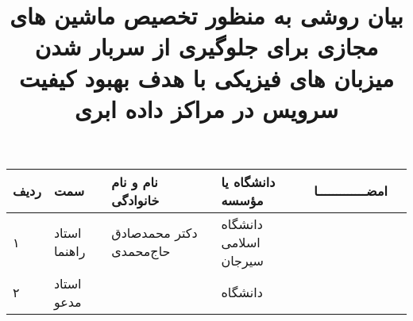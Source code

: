 \subject{مهندسی کامپیوتر}
\title{بیان روشی به منظور تخصیص ماشین های مجازی برای
	جلوگیری از سربار شدن میزبان های فیزیکی با هدف بهبود
	کیفیت سرویس در مراکز داده ابری}


\firstPage
{}
\besmPage
\davaranPage

\begin{center}
		\centering
\begin{tabular}{| p{8mm} | p{18mm} | p{36mm} |p{35mm}|p{}|c|}

\hline
ردیف	& سمت & نام و نام خانوادگی &	دانشگاه یا مؤسسه &	امضـــــــــــــا\\
\hline
۱  &	استاد راهنما				 & دکتر \newline محمدصادق حاج‌محمدی&  دانشگاه  اسلامی سیرجان &  \\
\hline
۲ &     استاد مدعو				 &  & دانشگاه \newline  & \\
\hline
\end{tabular}
\end{center}

